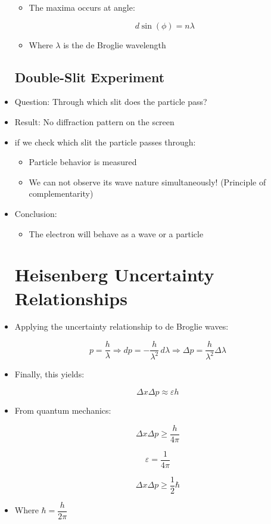 \begin{itemize}
\begin{itemize}
      \item The maxima occurs at angle:

        $$\boxed{d\sin(\phi)=n\lambda}$$

      \item Where $\lambda$ is the de Broglie wavelength

    \end{itemize}

    \subsection{Double-Slit Experiment}

  \item Question: Through which slit does the particle pass?

  \item Result: No diffraction pattern on the screen

  \item if we check which slit the particle passes through:

    \begin{itemize}

      \item Particle behavior is measured

      \item We can not observe its wave nature simultaneously! (Principle of complementarity)

    \end{itemize}

  \item Conclusion: 

    \begin{itemize}

      \item The electron will behave as a wave or a particle

    \end{itemize}

    \section{Heisenberg Uncertainty Relationships}

  \item Applying the uncertainty relationship to de Broglie waves:

    $$p=\frac{h}{\lambda}\Rightarrow dp=-\frac{h}{\lambda^2}\,d\lambda\Rightarrow \Delta p = \frac{h}{\lambda^2}\Delta\lambda$$

  \item Finally, this yields:

    $$\Delta x\Delta p\approx \varepsilon h$$

  \item From quantum mechanics:

    $$\Delta x\Delta p\geq\frac{h}{4\pi}$$

    $$\varepsilon=\frac{1}{4\pi}$$

    $$\Delta x \Delta p \geq \frac{1}{2}\hbar$$

  \item Where $\hbar=\dfrac{h}{2\pi}$

\end{itemize}



